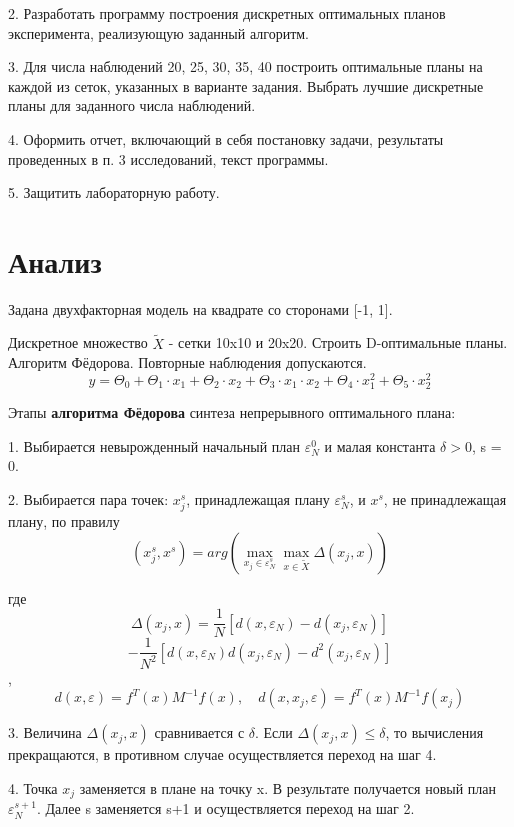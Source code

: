 2.	Разработать программу построения дискретных оптимальных планов эксперимента, реализующую заданный алгоритм.  

3.	Для числа наблюдений 20, 25, 30, 35, 40 построить оптимальные планы на каждой из сеток, указанных в варианте задания. Выбрать лучшие дискретные планы для заданного числа наблюдений.  

4.	Оформить отчет, включающий в себя постановку задачи, результаты проведенных в п. 3 исследований, текст программы.  

5.	Защитить лабораторную работу.  



\section{Анализ}

Задана двухфакторная модель на квадрате со сторонами [-1, 1].

Дискретное множество $\tilde{X}$ - сетки 10x10 и 20x20. Строить D-оптимальные планы.
Алгоритм Фёдорова. Повторные наблюдения допускаются.
\[ y = \Theta_0 + \Theta_1 \cdot x_1 + \Theta_2 \cdot x_2 + \Theta_3 \cdot x_1 \cdot x_2 + \Theta_4 \cdot x_1^2 + \Theta_5 \cdot x_2^2 \]


Этапы {\bf алгоритма Фёдорова} синтеза непрерывного оптимального плана:

1. Выбирается невырожденный начальный план $\varepsilon^0_N$ и малая константа $\delta>0$, s = 0.

2. Выбирается пара точек: $x_j^s$, принадлежащая плану $\varepsilon^s_N$, и $x^s$, не принадлежащая плану, по правилу
\[ \left(x_j^s, x^s\right) = arg \left( \max_{x_j \in \varepsilon^s_N} \max_{x \in \tilde{X}} \Delta(x_j, x) \right) \]

где
\[ \Delta(x_j, x) = \frac{1}{N} \left[ d(x, \varepsilon_N) - d(x_j, \varepsilon_N) \right] \]
\[ - \frac{1}{N^2} \left[ d(x, \varepsilon_N) d(x_j, \varepsilon_N) - d^2 (x_j, \varepsilon_N) \right] \],
\[ d(x, \varepsilon) = f^T(x) M^{-1} f(x), \quad d(x,x_j, \varepsilon) = f^T(x) M^{-1} f(x_j) \]

3. Величина $\Delta(x_j, x)$ сравнивается с $\delta$. Если $\Delta(x_j, x) \le \delta$,
то вычисления прекращаются, в противном случае осуществляется переход на шаг 4.

4. Точка $x_j$ заменяется в плане на точку x. В результате получается новый план 
$\varepsilon_N^{s+1}$. Далее s  заменяется s+1 и осуществляется переход на шаг 2.

